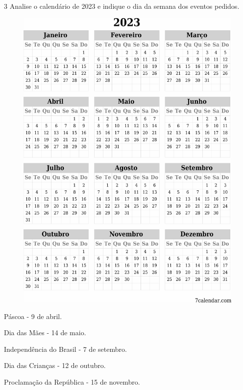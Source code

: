 \pagebreak
\num{3} Analise o calendário de 2023 e indique o dia da semana dos eventos pedidos.


\begin{figure}[htpb!]
\includegraphics[width=\textwidth]{./media/image52.png}
\end{figure}

\begin{escolha}[itemsep=-5pt]
\item  Páscoa - 9 de abril.

\item  Dia das Mães - 14 de maio.

\item  Independência do Brasil - 7 de setembro.

\item  Dia das Crianças - 12 de outubro.

\item  Proclamação da República - 15 de novembro.
\end{escolha}

